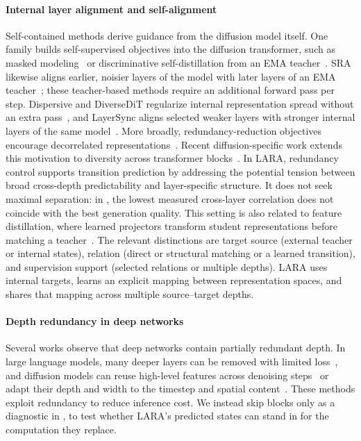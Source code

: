 \paragraph{Internal layer alignment and self-alignment}
Self-contained methods derive guidance from the diffusion model itself. One family builds self-supervised objectives into the diffusion transformer, such as masked modeling~\citep{zheng2023fast} or discriminative self-distillation from an EMA teacher~\citep{zhu2024sddit,tarvainen2017mean}. SRA likewise aligns earlier, noisier layers of the model with later layers of an EMA teacher~\citep{jiang2025sra}; these teacher-based methods require an additional forward pass per step. Dispersive and DiverseDiT regularize internal representation spread without an extra pass~\citep{wang2025dispersive,yang2026diversedit}, and LayerSync aligns selected weaker layers with stronger internal layers of the same model~\citep{haghighi2026layersync}. More broadly, redundancy-reduction objectives encourage decorrelated representations~\citep{zbontar2021barlow}. Recent diffusion-specific work extends this motivation to diversity across transformer blocks~\citep{li2026diverseditpp}. In LARA, redundancy control supports transition prediction by addressing the potential tension between broad cross-depth predictability and layer-specific structure. It does not seek maximal separation: in , the lowest measured cross-layer correlation does not coincide with the best generation quality. This setting is also related to feature distillation, where learned projectors transform student representations before matching a teacher~\citep{chen2026p05}. The relevant distinctions are target source (external teacher or internal states), relation (direct or structural matching or a learned transition), and supervision support (selected relations or multiple depths). LARA uses internal targets, learns an explicit mapping between representation spaces, and shares that mapping across multiple source--target depths.

\paragraph{Depth redundancy in deep networks}
Several works observe that deep networks contain partially redundant depth. In large language models, many deeper layers can be removed with limited loss~\citep{gromov2024unreasonable}, and diffusion models can reuse high-level features across denoising steps~\citep{ma2024deepcache} or adapt their depth and width to the timestep and spatial content~\citep{zhao2026p08}. These methods exploit redundancy to reduce inference cost. We instead skip blocks only as a diagnostic in , to test whether LARA's predicted states can stand in for the computation they replace.
